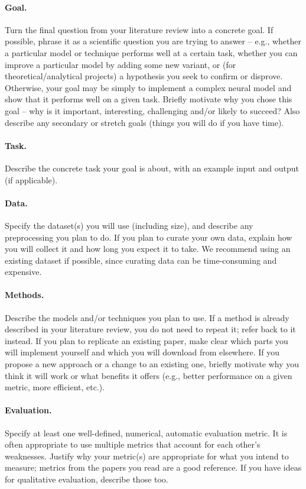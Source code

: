 \documentclass{article}
\newcommand{\note}[1]{#1}
\begin{document}
     \paragraph{Goal.}
        \note{Turn the final question from your literature review into a concrete goal. If possible, phrase it as a scientific question you are trying to answer -- e.g., whether a particular model or technique performs well at a certain task, whether you can improve a particular model by adding some new variant, or (for theoretical/analytical projects) a hypothesis you seek to confirm or disprove. Otherwise, your goal may be simply to implement a complex neural model and show that it performs well on a given task. Briefly motivate why you chose this goal -- why is it important, interesting, challenging and/or likely to succeed? Also describe any secondary or stretch goals (things you will do if you have time).}

    \paragraph{Task.}
        \note{Describe the concrete task your goal is about, with an example input and output (if applicable).}

    \paragraph{Data.}
        \note{Specify the dataset(s) you will use (including size), and describe any preprocessing you plan to do. If you plan to curate your own data, explain how you will collect it and how long you expect it to take. We recommend using an existing dataset if possible, since curating data can be time-consuming and expensive.}

    \paragraph{Methods.}
        \note{Describe the models and/or techniques you plan to use. If a method is already described in your literature review, you do not need to repeat it; refer back to it instead. If you plan to replicate an existing paper, make clear which parts you will implement yourself and which you will download from elsewhere. If you propose a new approach or a change to an existing one, briefly motivate why you think it will work or what benefits it offers (e.g., better performance on a given metric, more efficient, etc.).}

    \paragraph{Evaluation.}
        \note{Specify at least one well-defined, numerical, automatic evaluation metric. It is often appropriate to use multiple metrics that account for each other's weaknesses. Justify why your metric(s) are appropriate for what you intend to measure; metrics from the papers you read are a good reference. If you have ideas for qualitative evaluation, describe those too.}
\end{document}
